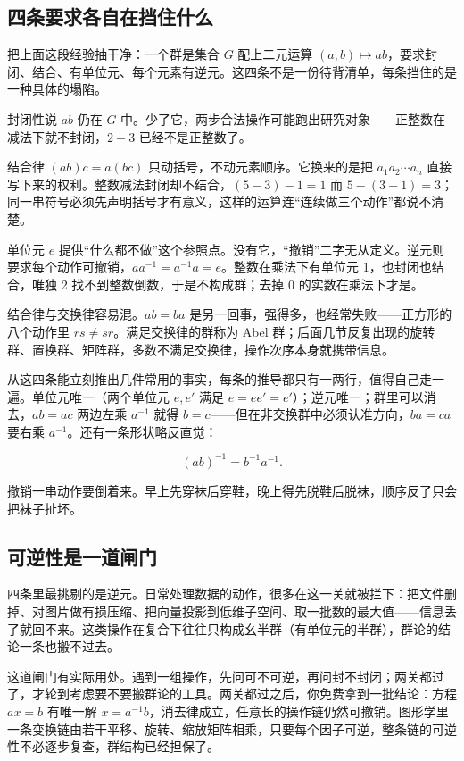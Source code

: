 \subsection{四条要求各自在挡住什么}

把上面这段经验抽干净：一个群是集合 \(G\) 配上二元运算 \((a,b)\mapsto ab\)，要求封闭、结合、有单位元、每个元素有逆元。这四条不是一份待背清单，每条挡住的是一种具体的塌陷。

封闭性说 \(ab\) 仍在 \(G\) 中。少了它，两步合法操作可能跑出研究对象——正整数在减法下就不封闭，\(2-3\) 已经不是正整数了。

结合律 \((ab)c=a(bc)\) 只动括号，不动元素顺序。它换来的是把 \(a_1a_2\cdots a_n\) 直接写下来的权利。整数减法封闭却不结合，\((5-3)-1=1\) 而 \(5-(3-1)=3\)；同一串符号必须先声明括号才有意义，这样的运算连``连续做三个动作''都说不清楚。

单位元 \(e\) 提供``什么都不做''这个参照点。没有它，``撤销''二字无从定义。逆元则要求每个动作可撤销，\(aa^{-1}=a^{-1}a=e\)。整数在乘法下有单位元 1，也封闭也结合，唯独 2 找不到整数倒数，于是不构成群；去掉 0 的实数在乘法下才是。

结合律与交换律容易混。\(ab=ba\) 是另一回事，强得多，也经常失败——正方形的八个动作里 \(rs\ne sr\)。满足交换律的群称为 Abel 群；后面几节反复出现的旋转群、置换群、矩阵群，多数不满足交换律，操作次序本身就携带信息。

从这四条能立刻推出几件常用的事实，每条的推导都只有一两行，值得自己走一遍。单位元唯一（两个单位元 \(e,e'\) 满足 \(e=ee'=e'\)）；逆元唯一；群里可以消去，\(ab=ac\) 两边左乘 \(a^{-1}\) 就得 \(b=c\)——但在非交换群中必须认准方向，\(ba=ca\) 要右乘 \(a^{-1}\)。还有一条形状略反直觉：

\[
(ab)^{-1}=b^{-1}a^{-1}.
\]

撤销一串动作要倒着来。早上先穿袜后穿鞋，晚上得先脱鞋后脱袜，顺序反了只会把袜子扯坏。

\subsection{可逆性是一道闸门}

四条里最挑剔的是逆元。日常处理数据的动作，很多在这一关就被拦下：把文件删掉、对图片做有损压缩、把向量投影到低维子空间、取一批数的最大值——信息丢了就回不来。这类操作在复合下往往只构成幺半群（有单位元的半群），群论的结论一条也搬不过去。

这道闸门有实际用处。遇到一组操作，先问可不可逆，再问封不封闭；两关都过了，才轮到考虑要不要搬群论的工具。两关都过之后，你免费拿到一批结论：方程 \(ax=b\) 有唯一解 \(x=a^{-1}b\)，消去律成立，任意长的操作链仍然可撤销。图形学里一条变换链由若干平移、旋转、缩放矩阵相乘，只要每个因子可逆，整条链的可逆性不必逐步复查，群结构已经担保了。

